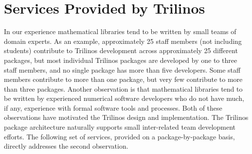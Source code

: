 \documentclass[acmtoms,acmnow]{acmtrans2m}
\begin{document}
\section{Services Provided by Trilinos}
\label{sect:TrilinosServices}

In our experience mathematical libraries tend to be written by small
teams of domain experts.  As an example, approximately 25 staff
members (not including students) contribute to Trilinos development 
across approximately 25
different packages, but most individual Trilinos packages
are developed by one to three staff members, and no single package 
has more than five
developers.   Some staff members contribute to more than one package,
but very few contribute to more than three packages.  Another
observation is that mathematical libraries tend to be written
by experienced numerical software
developers who do not have much, if any, experience with formal
software tools and processes.  Both of these observations have
motivated the Trilinos design and implementation.  The Trilinos
package architecture naturally supports small inter-related team
development efforts.  The following set of services, provided on a
package-by-package basis, directly addresses the second observation.
\end{document}
